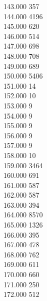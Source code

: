 { 143.000	357 \\
 144.000	4196 \\
 145.000	620 \\
 146.000	514 \\
 147.000	698 \\
 148.000	708 \\
 149.000	689 \\
 150.000	5406 \\
 151.000	14 \\
 152.000	10 \\
 153.000	9 \\
 154.000	9 \\
 155.000	9 \\
 156.000	9 \\
 157.000	9 \\
 158.000	10 \\
 159.000	3464 \\
 160.000	691 \\
 161.000	587 \\
 162.000	587 \\
 163.000	394 \\
 164.000	8570 \\
 165.000	1326 \\
 166.000	395 \\
 167.000	478 \\
 168.000	762 \\
 169.000	611 \\
 170.000	660 \\
 171.000	250 \\
 172.000	512 \\
}
